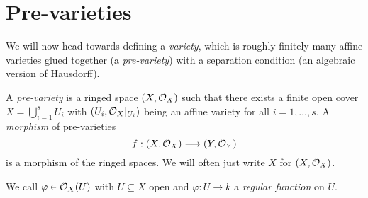 \section{Pre-varieties}

\begin{remark}
  We will now head towards defining
  a \emph{variety}, which is roughly
  finitely many affine varieties glued
  together (a \emph{pre-variety}) with a separation
  condition (an algebraic version of
  Hausdorff).
\end{remark}

\begin{definition}
  A \emph{pre-variety} is a ringed
  space $(X, \mathcal{O}_X)$ such that
  there exists a finite open cover
  $X = \bigcup_{i = 1}^s U_i$ with
  $(U_i, \mathcal{O}_X|_{U_i})$ being an
  affine variety for all $i = 1, \dots, s$.
  A \emph{morphism} of pre-varieties
  \[
    f : (X, \mathcal{O}_X) \longrightarrow (Y, \mathcal{O}_Y)
  \]
  is a morphism of the ringed spaces.
  We will often just write
  $X$ for $(X, \mathcal{O}_X)$.
\end{definition}

\begin{remark}
  We call $\varphi \in \mathcal{O}_X(U)$ with
  $U \subseteq X$ open and
  $\varphi : U \to k$ a \emph{regular function}
  on $U$.
\end{remark}

